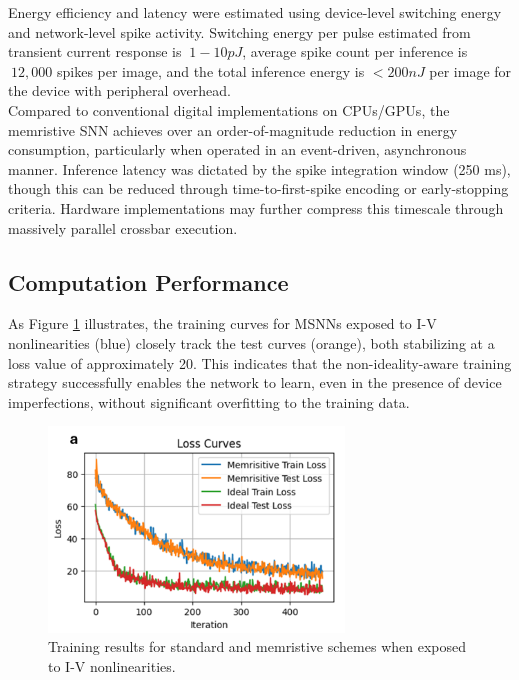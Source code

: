 \noindent Energy efficiency and latency were estimated using device-level switching energy and network-level spike activity. Switching energy per pulse estimated from transient current response is $~1-10 pJ$, average spike count per inference is $~12,000$ spikes per image, and the total inference energy is $< 200 nJ$ per image for the device with peripheral overhead. \\

\noindent Compared to conventional digital implementations on CPUs/GPUs, the memristive SNN achieves over an order-of-magnitude reduction in energy consumption, particularly when operated in an event-driven, asynchronous manner. Inference latency was dictated by the spike integration window (250 ms), though this can be reduced through time-to-first-spike encoding or early-stopping criteria. Hardware implementations may further compress this timescale through massively parallel crossbar execution.

\subsection[Computation Performance]{Computation Performance}


As Figure \ref{fig:6j} illustrates, the training curves for MSNNs exposed to I-V nonlinearities (blue) closely track the test curves (orange), both stabilizing at a loss value of approximately 20. This indicates that the non-ideality-aware training strategy successfully enables the network to learn, even in the presence of device imperfections, without significant overfitting to the training data.\\

\begin{figure}[htbp!] 
    \centering    
    \includegraphics[width=0.7\textwidth]{Chapter6/Figs/j.png}
    \caption[Training results for standard and memristive schemes when exposed to I-V nonlinearities.]{Training results for standard and memristive schemes when exposed to I-V nonlinearities.}
    \label{fig:6j}
\end{figure}


